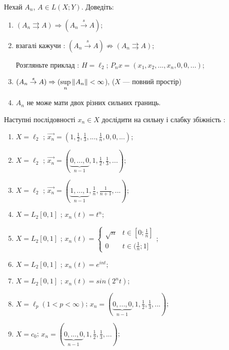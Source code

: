 \begin{exercise}
    Нехай $A_n$, $A \in L(X; Y)$. Доведіть: 
    \begin{enumerate}
        \item $(A_n \rightrightarrows A) \Rightarrow (A_n 
        \overset{s}{\rightarrow} A)$;
        \item взагалі кажучи : $(A_n 
        \overset{s}{\rightarrow} A) \nRightarrow (A_n \rightrightarrows A)$;

        Розгляньте приклад : $H = \ell_2$; $P_nx = (x_1, x_2, ..., x_n, 0, 0, ...)$;

        \item $(A_n \overset{s}{\rightarrow} A) \Rightarrow (\underset{n}{\sup}\left\lVert A_n\right\rVert 
        < \infty$), ($X$ --- повний простір)

        \item $A_n$ не може мати двох різних сильних границь.
    \end{enumerate}
\end{exercise}

\begin{exercise}
    Наступні послідовності $x_n \in X$ дослідити на сильну і слабку збіжність : 
    \begin{enumerate}
        \item $X = \ell_2$ ; $\vec{x_n} = (1, \frac{1}{2}, \frac{1}{3}, ..., \frac{1}{n}, 0, 0
        , ...)$;
        \item $X = \ell_2$ ; $\vec{x_n} = ( \underbrace{0, ..., 0}_{n-1} ,
        1, \frac{1}{2}, \frac{1}{3}, ...)$;
        \item $X = \ell_2$ ; $\vec{x_n} = ( \underbrace{1, ..., 1}_{n-1} ,
        \frac{1}{n}, \frac{1}{n+1}, ...)$;
        \item $X = L_2[0, 1]$ ; $x_n(t) = t^n$;
        \item $X = L_2[0, 1]$ ; $x_n(t) =  \begin{cases}
            \sqrt{n} & t \in [0; \frac{1}{n}] \\
            0 & t \in (\frac{1}{n}; 1]
        \end{cases}$;
        \item $X = L_2[0, 1]$ ; $x_n(t) = e^{int}$;
        \item $X = L_2[0, 1]$ ; $x_n(t) = sin(2^nt)$;
        \item $X = \ell_p (1 < p < \infty)$; $x_n = ( \underbrace{0, ..., 0}_{n-1} ,
        1, \frac{1}{2}, \frac{1}{3}, ...)$;
        \item $X = c_0$; $x_n = ( \underbrace{0, ..., 0}_{n-1} ,
        1, \frac{1}{2}, \frac{1}{3}, ...)$;
    \end{enumerate}
\end{exercise}